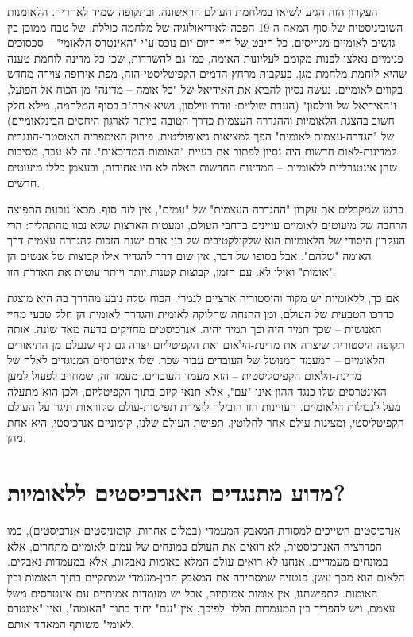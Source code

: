 העקרון הזה הגיע לשיאו במלחמת העולם הראשונה, ובתקופה שמיד לאחריה. הלאומנות השוביניסטית של סוף המאה ה-19 הפכה לאידיאולוגיה של מלחמה כוללת, של טבח ממוכן בין גושים לאומיים מגוייסים. כל היבט של חיי היום-יום נוכס ע"י "האינטרס הלאומי" – סכסוכים פנימיים נאלצו לפנות מקומם לעליונות האומה, כמו גם להשרדות, שכן כל מדינה לוחמת טענה שהיא לוחמת מלחמת מגן. בעקבות מרחץ-הדמים הקפיטליסטי הזה, מפת אירופה צוירה מחדש בקווים לאומיים. נעשה נסיון להביא את האידיאל של "כל אומה – מדינה" מן הכוח אל הפועל, ו"האידיאל של ווילסון" (הערת שוליים: וודרו ווילסון, נשיא ארה"ב בסוף המלחמה, מילא חלק חשוב בהצגת הלאומיות וההגדרה העצמית כדרך הטובה ביותר לארגון היחסים הבינלאומיים) של "הגדרה-עצמית לאומית" הפך למציאות גיאופוליטית. פירוק האימפריה האוסטרו-הונגרית למדינות-לאום חדשות היה נסיון לפתור את בעיית "האומות המדוכאות". זה לא עבד, מסיבות שהן אינטגרליות ללאומיות – המדינות החדשות האלה לא היו אחידות, ובעצמן כללו מיעוטים חדשים.

ברגע שמקבלים את עקרון "ההגדרה העצמית" של "עמים", אין לזה סוף. מכאן נובעת התפוצה הרחבה של מיעוטים לאומיים עויינים ברחבי העולם, ומעטות הארצות שלא נכוו מהתהליך: הרי העקרון היסודי של הלאומיות הוא שלקולקטיבים של בני אדם ישנה הזכות להגדרה עצמית דרך האומה "שלהם", אבל בסופו של דבר, אין שום דרך להגדיר אילו קבוצות של אנשים הן "אומות" ואילו לא. עם הזמן, קבוצות קטנות יותר ויותר עוטות את האדרת הזו.

אם כך, ללאומיות יש מקור והיסטוריה ארציים לגמרי. הכוח שלה נובע מהדרך בה היא מוצגת כדרכו הטבעית של העולם, ומן ההנחה שחלוקה לאומית והגדרה לאומית הן חלק טבעי מחיי האנושות – שכך תמיד היה וכך תמיד יהיה. אנרכיסטים מחזיקים בדעה מאד שונה. אותה תקופה היסטורית שיצרה את מדינת-הלאום ואת הקפיטליזם יצרה גם גוף שנעלם מן התיאורים הלאומיים – המעמד המנושל של העובדים עבור שכר, שלו אינטרסים המנוגדים לאלה של מדינת-הלאום הקפיטליסטית – הוא מעמד העובדים. מעמד זה, שמחויב לפעול למען האינטרסים שלו כנגד ההון אינו "עם", אלא תנאי קיום בתוך הקפיטליזם, ולכן הוא מתעלה מעל לגבולות הלאומיים. העויינות הזו הובילה ליצירת תפישות-עולם שקוראות תיגר על העולם הקפיטליסטי, ומציגות עולם אחר לחלוטין. תפישת-העולם שלנו, קומוניזם אנרכיסטי, היא אחת מהן.



\section{מדוע מתנגדים האנרכיסטים ללאומיות?}

אנרכיסטים השייכים למסורת המאבק המעמדי (במלים אחרות, קומוניסטים אנרכיסטים), כמו הפדרציה האנרכיסטית, לא רואים את העולם במונחים של עמים לאומיים מתחרים, אלא במונחים מעמדיים. אנחנו לא רואים עולם המלא באומות נאבקות, אלא במעמדות נאבקים. הלאום הוא מסך עשן, פנטזיה שמסתירה את המאבק הבין-מעמדי שמתקיים בתוך האומות ובין האומות. לתפישתנו, אין אומות אמיתיות, אבל יש מעמדות אמיתיים עם אינטרסים משל עצמם, ויש להפריד בין המעמדות הללו. לפיכך, אין "עם" יחיד בתוך "האומה", ואין "אינטרס לאומי" משותף המאחד אותם.

